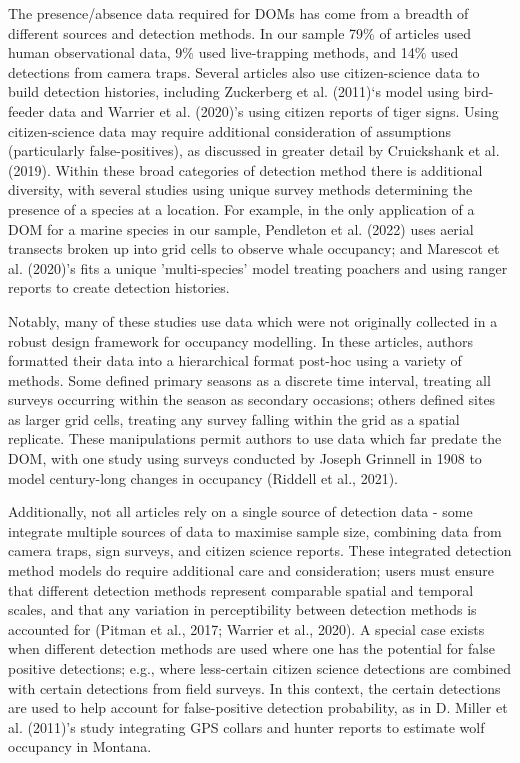 \documentclass[
]{article}
\begin{document}
The presence/absence data required for DOMs has come from a breadth of
different sources and detection methods. In our sample 79\% of articles
used human observational data, 9\% used live-trapping methods, and 14\%
used detections from camera traps. Several articles also use
citizen-science data to build detection histories, including Zuckerberg
et al. (2011)`s model using bird-feeder data and Warrier et al. (2020)'s
using citizen reports of tiger signs. Using citizen-science data may
require additional consideration of assumptions (particularly
false-positives), as discussed in greater detail by Cruickshank et al.
(2019). Within these broad categories of detection method there is
additional diversity, with several studies using unique survey methods
determining the presence of a species at a location. For example, in the
only application of a DOM for a marine species in our sample, Pendleton
et al. (2022) uses aerial transects broken up into grid cells to observe
whale occupancy; and Marescot et al. (2020)'s fits a unique
'multi-species' model treating poachers and using ranger reports to
create detection histories.

Notably, many of these studies use data which were not originally
collected in a robust design framework for occupancy modelling. In these
articles, authors formatted their data into a hierarchical format
post-hoc using a variety of methods. Some defined primary seasons as a
discrete time interval, treating all surveys occurring within the season
as secondary occasions; others defined sites as larger grid cells,
treating any survey falling within the grid as a spatial replicate.
These manipulations permit authors to use data which far predate the
DOM, with one study using surveys conducted by Joseph Grinnell in 1908
to model century-long changes in occupancy (Riddell et al., 2021).

Additionally, not all articles rely on a single source of detection data
- some integrate multiple sources of data to maximise sample size,
combining data from camera traps, sign surveys, and citizen science
reports. These integrated detection method models do require additional
care and consideration; users must ensure that different detection
methods represent comparable spatial and temporal scales, and that any
variation in perceptibility between detection methods is accounted for
(Pitman et al., 2017; Warrier et al., 2020). A special case exists when
different detection methods are used where one has the potential for
false positive detections; e.g., where less-certain citizen science
detections are combined with certain detections from field surveys. In
this context, the certain detections are used to help account for
false-positive detection probability, as in D. Miller et al. (2011)'s
study integrating GPS collars and hunter reports to estimate wolf
occupancy in Montana.
\end{document}
